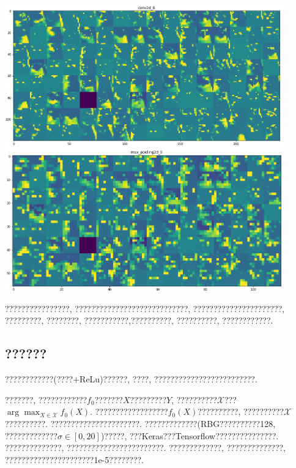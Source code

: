 \documentclass[lang=cn,11pt]{elegantpaper}
\begin{document}
\begin{center}
\includegraphics[width=0.9\textwidth]{conv2d_8}\\
\includegraphics[width=0.9\textwidth]{max_pooling2d_8}

\end{center}

????????????????, ????????????????????????????, ??????????????????????, ?????????, ????????, ???????????,??????????, ??????????, ????????????. 

\subsection{??????}

????????????(????$+$ReLu)??????, ????, ?????????????????????????. 

???????, ????????????$f_0$???????$X$?????????$Y$, ??????????$\mathcal X$???$\arg \max_{X\in \mathcal X} f_0(X)$. ??????????????????$f_0(X)$??????????, ??????????$\mathcal X$??????????. ??????????????????????. ?????????????(RBG??????????128, ?????????????$\sigma\in[0,20]$)?????, ???Keras???Tensorflow???????????????. ??????????????, ????????????????????????. ?????????????, ??????????????, ??????????????????????1e-5????????. 
\end{document}
